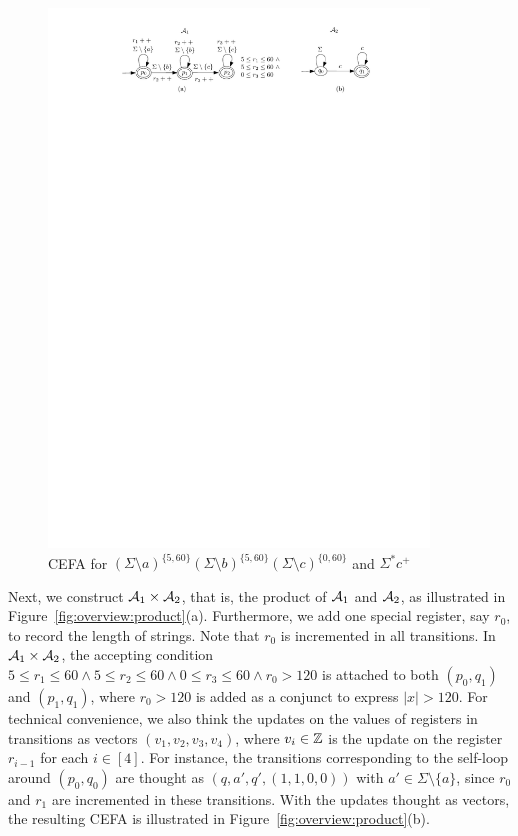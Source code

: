 \begin{figure}[ht]
  \centering
  \includegraphics[width = 0.9\textwidth]{sections/overview-cefa.pdf}
  \caption{CEFA for $(\Sigma \setminus a)^{\{5, 60\}} (\Sigma \setminus b)^{\{5, 60\}} (\Sigma \setminus c)^{\{0, 60\}}$ and $\Sigma^* c^+$}
  \label{fig:overview}
\end{figure}

Next, 
we construct $\mathcal{A}_1 \times \mathcal{A}_2$, that is, the product of $\mathcal{A}_1$ and $\mathcal{A}_2$, as illustrated in Figure~\ref{fig:overview:product}(a). Furthermore, we add one special register, say $r_0$, to record the length of strings. Note that $r_0$ is incremented in all transitions. In $\mathcal{A}_1 \times \mathcal{A}_2$, the accepting condition $5 \le r_1 \le 60 \wedge 5 \le r_2 \le 60 \wedge 0 \le r_3 \le 60 \wedge r_0 > 120$ is attached to both $(p_0,q_1)$ and $(p_1,q_1)$, where $r_0 > 120$ is added as a conjunct to express $|x| > 120$.  For technical convenience, we also think the updates on the values of registers in transitions as vectors $(v_1, v_2, v_3, v_4)$, where $v_i \in \mathbb{Z}$ is the update on the register $r_{i-1}$ for each $i \in [4]$. For instance, the transitions corresponding to the self-loop around $(p_0, q_0)$ are thought as $(q, a', q', (1,1,0,0))$ with $a' \in \Sigma \setminus \{a\}$, since $r_0$ and $r_1$ are incremented in these transitions. With the updates thought as vectors, the resulting CEFA is illustrated in Figure~\ref{fig:overview:product}(b).


